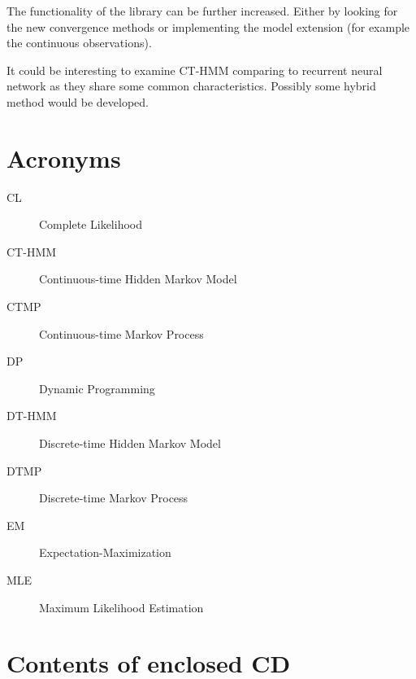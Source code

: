 \documentclass[thesis=M,english]{FITthesis}[2012/10/20]
\begin{document}
The functionality of the library can be further increased. Either by looking for the new convergence methods or implementing the model extension (for example the continuous observations).

It could be interesting to examine CT-HMM comparing to recurrent neural network as they share some common characteristics. Possibly some hybrid method would be developed. 




\appendix

\chapter{Acronyms}
\begin{description}
	\item[CL] Complete Likelihood
	\item[CT-HMM] Continuous-time Hidden Markov Model
	\item[CTMP] Continuous-time Markov Process
	\item[DP] Dynamic Programming
	\item[DT-HMM] Discrete-time Hidden Markov Model	
	\item[DTMP] Discrete-time Markov Process	
	\item[EM] Expectation-Maximization 
	\item[MLE] Maximum Likelihood Estimation
	
\end{description}


\chapter{Contents of enclosed CD}


\begin{figure}
\end{figure}
\end{document}
